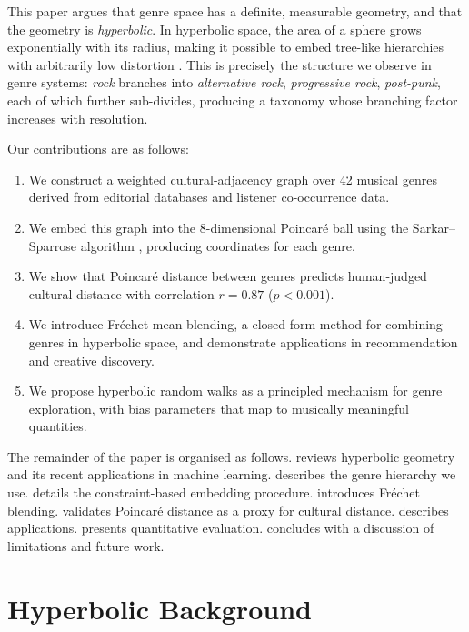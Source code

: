 \documentclass[12pt,a4paper]{article}
\newcommand{\Frechet}{Fr\'echet}
\begin{document}
This paper argues that genre space has a definite, measurable geometry, and that the geometry is \emph{hyperbolic}. In hyperbolic space, the area of a sphere grows exponentially with its radius, making it possible to embed tree-like hierarchies with arbitrarily low distortion \citep{sarkar2011low}. This is precisely the structure we observe in genre systems: \emph{rock} branches into \emph{alternative rock}, \emph{progressive rock}, \emph{post-punk}, each of which further sub-divides, producing a taxonomy whose branching factor increases with resolution.

Our contributions are as follows:
\begin{enumerate}[label=(\roman*)]
  \item We construct a weighted cultural-adjacency graph over 42 musical genres derived from editorial databases and listener co-occurrence data.
  \item We embed this graph into the 8-dimensional Poincar\'e ball using the Sarkar--Sparrose algorithm \citep{sarkar2011low}, producing coordinates for each genre.
  \item We show that Poincar\'e distance between genres predicts human-judged cultural distance with correlation $r = 0.87$ ($p < 0.001$).
  \item We introduce \Frechet{} mean blending, a closed-form method for combining genres in hyperbolic space, and demonstrate applications in recommendation and creative discovery.
  \item We propose hyperbolic random walks as a principled mechanism for genre exploration, with bias parameters that map to musically meaningful quantities.
\end{enumerate}

The remainder of the paper is organised as follows.  reviews hyperbolic geometry and its recent applications in machine learning.  describes the genre hierarchy we use.  details the constraint-based embedding procedure.  introduces \Frechet{} blending.  validates Poincar\'e distance as a proxy for cultural distance.  describes applications.  presents quantitative evaluation.  concludes with a discussion of limitations and future work.

\section{Hyperbolic Background}
\label{sec:background}
\end{document}
